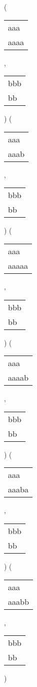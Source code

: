  ( 
\begin{tabular}{|l|} \hline
aaa\  \\
aaaa \\
\hline
\end{tabular} 
 , 
\begin{tabular}{|l|} \hline
bbb \\
bb\  \\
\hline
\end{tabular} 
) 
 ( 
\begin{tabular}{|l|} \hline
aaa\  \\
aaab \\
\hline
\end{tabular} 
 , 
\begin{tabular}{|l|} \hline
bbb \\
bb\  \\
\hline
\end{tabular} 
) 
 ( 
\begin{tabular}{|l|} \hline
aaa\ \  \\
aaaaa \\
\hline
\end{tabular} 
 , 
\begin{tabular}{|l|} \hline
bbb \\
bb\  \\
\hline
\end{tabular} 
) 
 ( 
\begin{tabular}{|l|} \hline
aaa\ \  \\
aaaab \\
\hline
\end{tabular} 
 , 
\begin{tabular}{|l|} \hline
bbb \\
bb\  \\
\hline
\end{tabular} 
) 
 ( 
\begin{tabular}{|l|} \hline
aaa\ \  \\
aaaba \\
\hline
\end{tabular} 
 , 
\begin{tabular}{|l|} \hline
bbb \\
bb\  \\
\hline
\end{tabular} 
) 
 ( 
\begin{tabular}{|l|} \hline
aaa\ \  \\
aaabb \\
\hline
\end{tabular} 
 , 
\begin{tabular}{|l|} \hline
bbb \\
bb\  \\
\hline
\end{tabular} 
) 
